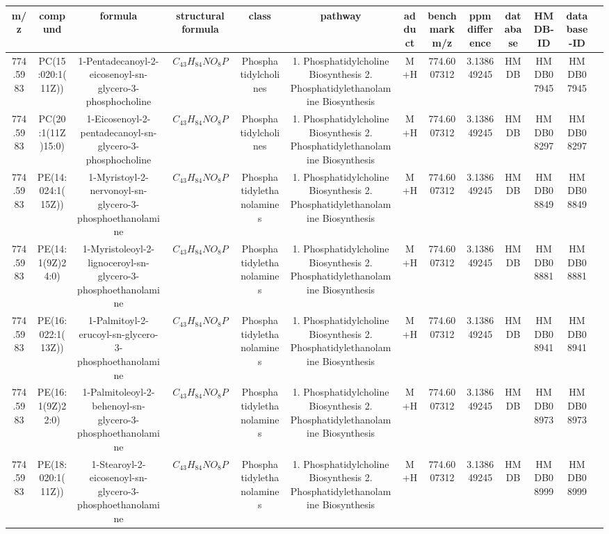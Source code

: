 \documentclass{WileyMSP-template}
\begin{document}
\begin{landscape}
\begin{table}
\begin{adjustbox}{center}
{\begin{tabular}{|c|c|c|c|c|c|c|c|c|c|c|c|c|}
            \bottomrule




            m/z & compund & formula & structural formula & class & pathway  & adduct & benchmark m/z & ppm difference & database & HMDB-ID & database-ID\\
            \bottomrule
            774.5983 & PC(15:020:1(11Z)) & 1-Pentadecanoyl-2-eicosenoyl-sn-glycero-3-phosphocholine & $ C_{43}H_{84}NO_{8}P $ & Phosphatidylcholines & 1. Phosphatidylcholine Biosynthesis 2. Phosphatidylethanolamine Biosynthesis & M+H & 774.6007312 & 3.138649245 & HMDB & HMDB07945 & HMDB07945\\
            774.5983 & PC(20:1(11Z)15:0) & 1-Eicosenoyl-2-pentadecanoyl-sn-glycero-3-phosphocholine & $ C_{43}H_{84}NO_{8}P $ & Phosphatidylcholines & 1. Phosphatidylcholine Biosynthesis 2. Phosphatidylethanolamine Biosynthesis & M+H & 774.6007312 & 3.138649245 & HMDB & HMDB08297 & HMDB08297\\
            774.5983 & PE(14:024:1(15Z)) & 1-Myristoyl-2-nervonoyl-sn-glycero-3-phosphoethanolamine & $ C_{43}H_{84}NO_{8}P $ & Phosphatidylethanolamines & 1. Phosphatidylcholine Biosynthesis 2. Phosphatidylethanolamine Biosynthesis & M+H & 774.6007312 & 3.138649245 & HMDB & HMDB08849 & HMDB08849\\
            774.5983 & PE(14:1(9Z)24:0) & 1-Myristoleoyl-2-lignoceroyl-sn-glycero-3-phosphoethanolamine & $ C_{43}H_{84}NO_{8}P $ & Phosphatidylethanolamines & 1. Phosphatidylcholine Biosynthesis 2. Phosphatidylethanolamine Biosynthesis & M+H & 774.6007312 & 3.138649245 & HMDB & HMDB08881 & HMDB08881\\
            774.5983 & PE(16:022:1(13Z)) & 1-Palmitoyl-2-erucoyl-sn-glycero-3-phosphoethanolamine & $ C_{43}H_{84}NO_{8}P $ & Phosphatidylethanolamines & 1. Phosphatidylcholine Biosynthesis 2. Phosphatidylethanolamine Biosynthesis & M+H & 774.6007312 & 3.138649245 & HMDB & HMDB08941 & HMDB08941\\
            774.5983 & PE(16:1(9Z)22:0) & 1-Palmitoleoyl-2-behenoyl-sn-glycero-3-phosphoethanolamine & $ C_{43}H_{84}NO_{8}P $ & Phosphatidylethanolamines & 1. Phosphatidylcholine Biosynthesis 2. Phosphatidylethanolamine Biosynthesis & M+H & 774.6007312 & 3.138649245 & HMDB & HMDB08973 & HMDB08973\\
            774.5983 & PE(18:020:1(11Z)) & 1-Stearoyl-2-eicosenoyl-sn-glycero-3-phosphoethanolamine & $ C_{43}H_{84}NO_{8}P $ & Phosphatidylethanolamines & 1. Phosphatidylcholine Biosynthesis 2. Phosphatidylethanolamine Biosynthesis & M+H & 774.6007312 & 3.138649245 & HMDB & HMDB08999 & HMDB08999\\

\end{tabular}}
\end{adjustbox}
\end{table}
\end{landscape}
\end{document}
